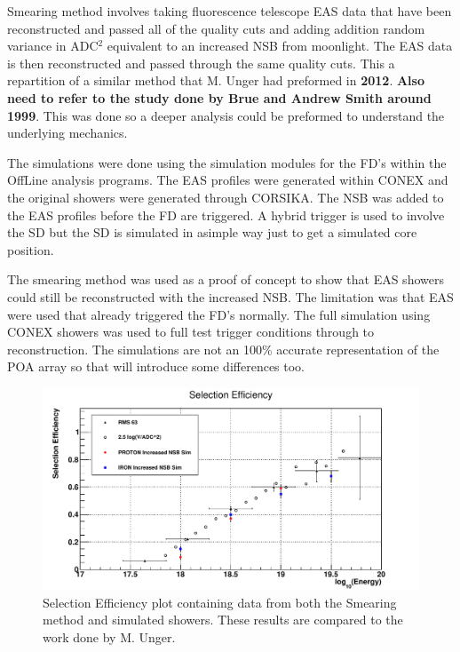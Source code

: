 Smearing method involves taking fluorescence telescope EAS data that have been reconstructed and passed all of the quality cuts and adding addition random variance in ADC$^2$ equivalent to an increased NSB from moonlight. The EAS data is then reconstructed and passed through the same quality cuts. This a repartition of a similar method that M. Unger had preformed in \textbf{2012}. \textbf{Also need to refer to the study done by Brue and Andrew Smith around 1999}. This was done so a deeper analysis could be preformed to understand the underlying mechanics.

The simulations were done using the simulation modules for the FD's within the OffLine analysis programs. The EAS profiles were generated within CONEX and the original showers were generated through CORSIKA. The NSB was added to the EAS profiles before the FD are triggered. A hybrid trigger is used to involve the SD but the SD is simulated in asimple way just to get a simulated core position.

The smearing method was used as a proof of concept to show that EAS showers could still be reconstructed with the increased NSB. The limitation was that EAS were used that already triggered the FD's normally. The full simulation using CONEX showers was used to full test trigger conditions through to reconstruction. The simulations are not an 100\% accurate representation of the POA array so that will introduce some differences too.


\begin{figure}[!hp]
\centering
\includegraphics[width=\textwidth]{chapters/graphs/SelectionEff/SelectionEff_errorbars_10timesNSB.pdf}
\caption{Selection Efficiency plot containing data from both the Smearing method and simulated showers. These results are compared to the work done by M. Unger.}
\end{figure}

